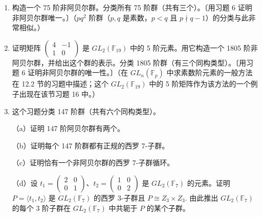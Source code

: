 \begin{enumerate}
（b）证明每个 56 阶群都有正规的西罗 2-子群或正规的西罗 7-子群。

（c）构造下列 56 阶非阿贝尔群：它们有正规的西罗 7-子群，且其西罗 2-子群 \(S\) 如下指定：
\begin{center}
当 \(S \cong Z_2 \times Z_2 \times Z_2\) 时有一个群；\\
当 \(S \cong Z_4 \times Z_2\) 时有两个不同构的群；\\
当 \(S \cong Z_8\) 时有一个群；\\
当 \(S \cong Q_8\) 时有两个不同构的群；\\
当 \(S \cong D_8\) 时有三个不同构的群。
\end{center}
〔对特定的 \(S\)，若从 \(S\) 到 \(\operatorname{Aut}(Z_7)\) 的映射的核不同构，则两个群不同构。〕

（d）设 \(G\) 是 56 阶群且有非正规的西罗 7-子群。证明若 \(S\) 是 \(G\) 的西罗 2-子群，则 \(S \cong Z_2 \times Z_2 \times Z_2\).〔让一个 7 阶元素通过共轭作用在 \(S\) 的七个非单位元上，并由此推出它们都有相同的阶。〕

（e）证明恰有一个 56 阶群有非正规的西罗 7-子群。〔存在性用 \(|\operatorname{GL}_3(\mathbb{F}_2)| = 168\)；唯一性用习题 6。〕

\item 构造一个 75 阶非阿贝尔群。分类所有 75 阶群（共有三个）。〔用习题 6 证明非阿贝尔群唯一。〕（\(pq^2\) 阶群（\(p, q\) 是素数，\(p < q\) 且 \(p \nmid q-1\)）的分类与此非常相似。）

\item 证明矩阵 \(\begin{pmatrix} 4 & -1 \\ 1 & 0 \end{pmatrix}\) 是 \(GL_2(\mathbb{F}_{19})\) 中的 5 阶元素。用它构造一个 1805 阶非阿贝尔群，并给出这个群的表示。分类 1805 阶群（有三个同构类型）。〔用习题 6 证明非阿贝尔群的唯一性。〕（在 \(GL_n(\mathbb{F}_p)\) 中求素数阶元素的一般方法在 12.2 节的习题中描述；这个 \(GL_2(\mathbb{F}_{19})\) 中的 5 阶矩阵作为该方法的一个例子出现在该节习题 16 中。）

\item 这个习题分类 147 阶群（共有六个同构类型）。

（a）证明 147 阶阿贝尔群有两个。

（b）证明每个 147 阶群都有正规的西罗 7-子群。

（c）证明恰有一个非阿贝尔群的西罗 7-子群循环。

（d）设 \(t_1 = \begin{pmatrix} 2 & 0 \\ 0 & 1 \end{pmatrix}\)、\(t_2 = \begin{pmatrix} 1 & 0 \\ 0 & 2 \end{pmatrix}\) 是 \(GL_2(\mathbb{F}_7)\) 的元素。证明 \(P = \langle t_1, t_2 \rangle\) 是 \(GL_2(\mathbb{F}_7)\) 的西罗 3-子群且 \(P \cong Z_3 \times Z_3\). 由此推出 \(GL_2(\mathbb{F}_7)\) 的每个 3 阶子群在 \(GL_2(\mathbb{F}_7)\) 中共轭于 \(P\) 的某个子群。


\end{enumerate}
